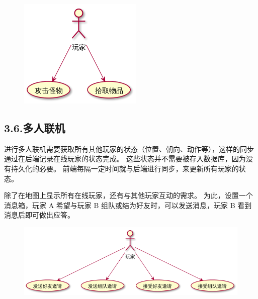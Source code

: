 \documentclass{article}
\begin{document}
\begin{figure}[tbp]%
\begin{mdcenter}%

\noindent{}\includegraphics[keepaspectratio=true]{./img/5}{}%

\mdhr{}%

\noindent{}%
\end{mdcenter}%
\end{figure}%

\subsection{3.6.\hspace*{0.5em}多人联机}\label{36}%

\noindent{}进行多人联机需要获取所有其他玩家的状态（位置、朝向、动作等），这样的同步通过在后端记录在线玩家的状态完成。 这些状态并不需要被存入数据库，因为没有持久化的必要。 前端每隔一定时间就与后端进行同步，来更新所有玩家的状态。%

除了在地图上显示所有在线玩家，还有与其他玩家互动的需求。 为此，设置一个消息箱，玩家 A 希望与玩家 B 组队或结为好友时，可以发送消息，玩家 B 看到消息后即可做出应答。%

\begin{figure}[tbp]%
\begin{mdcenter}%

\noindent{}\includegraphics[keepaspectratio=true,width=\dimwidth{0.90}]{./img/6}{}%

\mdhr{}%

\noindent{}%
\end{mdcenter}%
\end{figure}%
\end{document}
